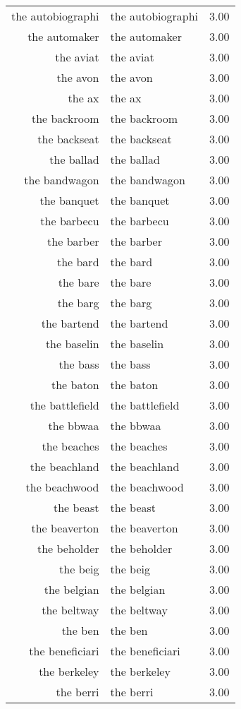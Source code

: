 \begin{table}[ht]
\begin{tabular}{rlr}
  the autobiographi & the autobiographi & 3.00 \\ 
  the automaker & the automaker & 3.00 \\ 
  the aviat & the aviat & 3.00 \\ 
  the avon & the avon & 3.00 \\ 
  the ax & the ax & 3.00 \\ 
  the backroom & the backroom & 3.00 \\ 
  the backseat & the backseat & 3.00 \\ 
  the ballad & the ballad & 3.00 \\ 
  the bandwagon & the bandwagon & 3.00 \\ 
  the banquet & the banquet & 3.00 \\ 
  the barbecu & the barbecu & 3.00 \\ 
  the barber & the barber & 3.00 \\ 
  the bard & the bard & 3.00 \\ 
  the bare & the bare & 3.00 \\ 
  the barg & the barg & 3.00 \\ 
  the bartend & the bartend & 3.00 \\ 
  the baselin & the baselin & 3.00 \\ 
  the bass & the bass & 3.00 \\ 
  the baton & the baton & 3.00 \\ 
  the battlefield & the battlefield & 3.00 \\ 
  the bbwaa & the bbwaa & 3.00 \\ 
  the beaches & the beaches & 3.00 \\ 
  the beachland & the beachland & 3.00 \\ 
  the beachwood & the beachwood & 3.00 \\ 
  the beast & the beast & 3.00 \\ 
  the beaverton & the beaverton & 3.00 \\ 
  the beholder & the beholder & 3.00 \\ 
  the beig & the beig & 3.00 \\ 
  the belgian & the belgian & 3.00 \\ 
  the beltway & the beltway & 3.00 \\ 
  the ben & the ben & 3.00 \\ 
  the beneficiari & the beneficiari & 3.00 \\ 
  the berkeley & the berkeley & 3.00 \\ 
  the berri & the berri & 3.00 \\ 

\end{tabular}
\end{table}
